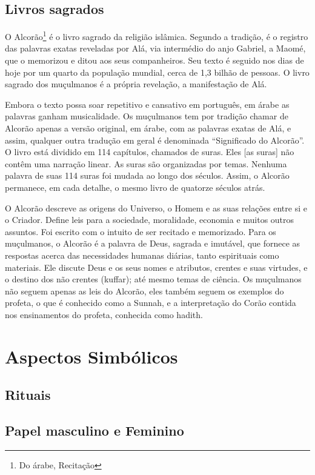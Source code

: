\documentclass[12pt]{article}
\begin{document}
\subsection{Livros sagrados}
O Alcorão\footnote{Do árabe, Recitação} é o livro sagrado da religião islâmica.
Segundo a tradição, é o registro das palavras exatas reveladas por Alá, via intermédio do anjo Gabriel, a Maomé, que o memorizou e ditou aos seus companheiros.
Seu texto é seguido nos dias de hoje por um quarto da população mundial, cerca de 1,3 bilhão de pessoas.
O livro sagrado dos muçulmanos é a própria revelação, a manifestação de Alá.
\par Embora o texto possa soar repetitivo e cansativo em português, em árabe as palavras ganham musicalidade.
Os muçulmanos tem por tradição chamar de Alcorão apenas a versão original, em árabe, com as palavras exatas de Alá, e assim, qualquer outra tradução em geral é denominada “Significado do Alcorão”.
O livro está dividido em 114 capítulos, chamados de suras. Eles [as suras] não contêm uma narração linear.
As suras são organizadas por temas.
Nenhuma palavra de suas 114 suras foi mudada ao longo dos séculos.
Assim, o Alcorão permanece, em cada detalhe, o mesmo livro de quatorze séculos atrás.
\par O Alcorão descreve as origens do Universo, o Homem e as suas relações entre si e o Criador.
Define leis para a sociedade, moralidade, economia e muitos outros assuntos.
Foi escrito com o intuito de ser recitado e memorizado.
Para os muçulmanos, o Alcorão é a palavra de Deus, sagrada e imutável, que fornece as respostas acerca das necessidades humanas diárias, tanto espirituais como materiais.
Ele discute Deus e os seus nomes e atributos, crentes e suas virtudes, e o destino dos não crentes (kuffar); até mesmo temas de ciência.
Os muçulmanos não seguem apenas as leis do Alcorão, eles também seguem os exemplos do profeta, o que é conhecido como a Sunnah, e a interpretação do Corão contida nos ensinamentos do profeta, conhecida como hadith.

\section{Aspectos Simbólicos}
\subsection{Rituais}
\subsection{Papel masculino e Feminino}
\end{document}
